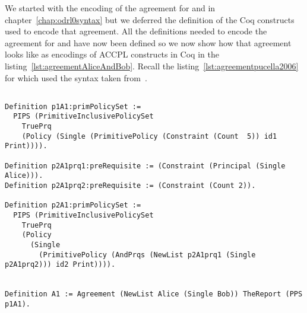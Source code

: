 We started with the encoding of the agreement for  and  in chapter~\ref{chap:odrl0syntax} but we deferred the definition of the Coq constructs used to encode that agreement. All the definitions needed to encode the agreement for  and  have now been defined so we now show how that agreement looks like as encodings of \ac{ACCPL} constructs in Coq in the listing~\ref{lst:agreementAliceAndBob}. Recall the listing~\ref{lst:agreementpucella2006} for  which used the syntax taken from~\cite{pucella2006}.



\lstset{language=Coq}
\begin{lstlisting}[frame=single, caption={Agreement for Alice and Bob in ACCPL},label={lst:agreementAliceAndBob}]

Definition p1A1:primPolicySet :=
  PIPS (PrimitiveInclusivePolicySet
    TruePrq
    (Policy (Single (PrimitivePolicy (Constraint (Count  5)) id1 Print)))).

Definition p2A1prq1:preRequisite := (Constraint (Principal (Single Alice))).
Definition p2A1prq2:preRequisite := (Constraint (Count 2)).

Definition p2A1:primPolicySet :=
  PIPS (PrimitiveInclusivePolicySet
    TruePrq
    (Policy 
      (Single 
        (PrimitivePolicy (AndPrqs (NewList p2A1prq1 (Single p2A1prq2))) id2 Print)))).


Definition A1 := Agreement (NewList Alice (Single Bob)) TheReport (PPS p1A1).
\end{lstlisting}	


